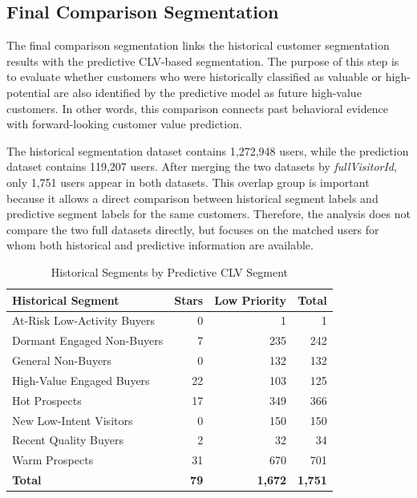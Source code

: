 \documentclass[conference]{IEEEtran}
\begin{document}
\subsection{Final Comparison Segmentation}

The final comparison segmentation links the historical customer segmentation results with the predictive CLV-based segmentation. The purpose of this step is to evaluate whether customers who were historically classified as valuable or high-potential are also identified by the predictive model as future high-value customers. In other words, this comparison connects past behavioral evidence with forward-looking customer value prediction.

The historical segmentation dataset contains 1,272,948 users, while the prediction dataset contains 119,207 users. After merging the two datasets by \textit{fullVisitorId}, only 1,751 users appear in both datasets. This overlap group is important because it allows a direct comparison between historical segment labels and predictive segment labels for the same customers. Therefore, the analysis does not compare the two full datasets directly, but focuses on the matched users for whom both historical and predictive information are available.

\begin{table}[H]
\centering
\caption{Historical Segments by Predictive CLV Segment}
\label{tab:hist_pred_segment_comparison}

\renewcommand{\arraystretch}{1.25}
\setlength{\tabcolsep}{5pt}
\footnotesize

\begin{tabular}{|l|r|r|r|}
\toprule
\textbf{Historical Segment} 
& \textbf{Stars} 
& \textbf{Low Priority} 
& \textbf{Total} \\
\midrule

At-Risk Low-Activity Buyers & 0 & 1 & 1 \\
Dormant Engaged Non-Buyers & 7 & 235 & 242 \\
General Non-Buyers & 0 & 132 & 132 \\
High-Value Engaged Buyers & 22 & 103 & 125 \\
Hot Prospects & 17 & 349 & 366 \\
New Low-Intent Visitors & 0 & 150 & 150 \\
Recent Quality Buyers & 2 & 32 & 34 \\
Warm Prospects & 31 & 670 & 701 \\

\midrule
\textbf{Total} & \textbf{79} & \textbf{1,672} & \textbf{1,751} \\
\bottomrule
\end{tabular}
\end{table}
\end{document}
